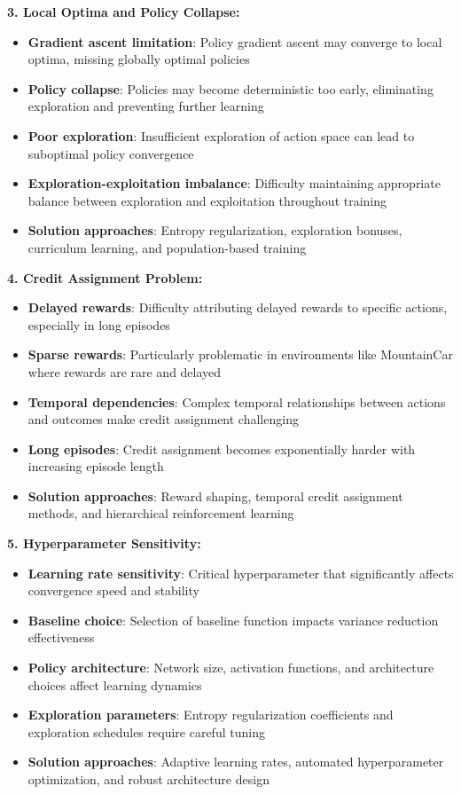 \documentclass[12pt]{article}
\begin{document}
{{{\textbf{3. Local Optima and Policy Collapse:}
\begin{itemize}
    \item \textbf{Gradient ascent limitation}: Policy gradient ascent may converge to local optima, missing globally optimal policies
    \item \textbf{Policy collapse}: Policies may become deterministic too early, eliminating exploration and preventing further learning
    \item \textbf{Poor exploration}: Insufficient exploration of action space can lead to suboptimal policy convergence
    \item \textbf{Exploration-exploitation imbalance}: Difficulty maintaining appropriate balance between exploration and exploitation throughout training
    \item \textbf{Solution approaches}: Entropy regularization, exploration bonuses, curriculum learning, and population-based training
\end{itemize}

\textbf{4. Credit Assignment Problem:}
\begin{itemize}
    \item \textbf{Delayed rewards}: Difficulty attributing delayed rewards to specific actions, especially in long episodes
    \item \textbf{Sparse rewards}: Particularly problematic in environments like MountainCar where rewards are rare and delayed
    \item \textbf{Temporal dependencies}: Complex temporal relationships between actions and outcomes make credit assignment challenging
    \item \textbf{Long episodes}: Credit assignment becomes exponentially harder with increasing episode length
    \item \textbf{Solution approaches}: Reward shaping, temporal credit assignment methods, and hierarchical reinforcement learning
\end{itemize}

\textbf{5. Hyperparameter Sensitivity:}
\begin{itemize}
    \item \textbf{Learning rate sensitivity}: Critical hyperparameter that significantly affects convergence speed and stability
    \item \textbf{Baseline choice}: Selection of baseline function impacts variance reduction effectiveness
    \item \textbf{Policy architecture}: Network size, activation functions, and architecture choices affect learning dynamics
    \item \textbf{Exploration parameters}: Entropy regularization coefficients and exploration schedules require careful tuning
    \item \textbf{Solution approaches}: Adaptive learning rates, automated hyperparameter optimization, and robust architecture design
\end{itemize}

}}}
\end{document}
